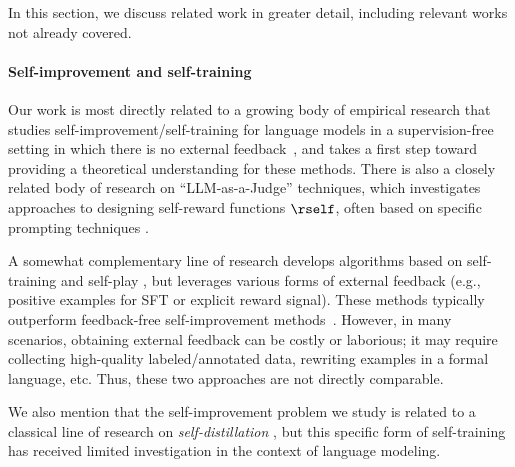 
In this section, we discuss related work in greater detail, including
relevant works not already covered.


\paragraph{Self-improvement and self-training}

Our work is most directly related to a growing body of empirical research that
studies self-improvement/self-training for language models in a
supervision-free setting in which there is no external
feedback~\citep{huang2022large,wang2022self,bai2022constitutional,pang2023language},
and takes a first step toward providing a theoretical understanding
for these methods. There is also a closely related body of research on 
``LLM-as-a-Judge''  techniques, which investigates approaches to
designing self-reward functions $\rself$, often based on specific
prompting techniques \citep{zheng2024judging,yuan2024self,wu2024meta,wang2024self}.

A somewhat complementary line of research develops
algorithms based on self-training and self-play
\citep{zelikman2022star,chen2024self,wu2024self,qu2024recursive}, but
leverages various forms of external feedback (e.g., positive examples
for SFT or explicit reward signal). 
These methods typically outperform feedback-free self-improvement methods~\citep{zelikman2022star}.
However, in many scenarios, obtaining external feedback can be costly or laborious; it may require collecting high-quality labeled/annotated data, rewriting examples in a formal language, etc. 
Thus, these two approaches are not directly comparable.


We also mention that the self-improvement problem we
study is related to a classical line of research on
\emph{self-distillation}
\citep{bucilua2006model,hinton2015distilling,devlin2018bert,pham2021meta,rizve2021defense},
but this specific form of self-training has received limited investigation
in the context of language modeling.

